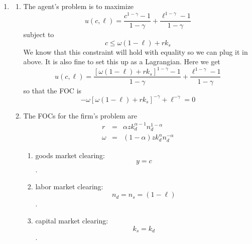 \documentclass[11pt]{article}
\begin{document}
\begin{enumerate}
\item 
\begin{enumerate}
\item The agent's problem is to maximize%
\begin{equation*}
u\left( c,\ell \right) =\frac{c^{1-\gamma }-1}{1-\gamma }+\frac{\ell
^{1-\gamma }-1}{1-\gamma }
\end{equation*}%
subject to 
\begin{equation*}
c\leq \omega \left( 1-\ell \right) +rk_{s}
\end{equation*}%
We know that this constraint will hold with equality so we can plug it in
above. It is also fine to set this up as a Lagrangian. Here we get 
\begin{equation*}
u\left( c,\ell \right) =\frac{\left[ \omega \left( 1-\ell \right) +rk_{s}%
\right] ^{1-\gamma }-1}{1-\gamma }+\frac{\ell ^{1-\gamma }-1}{1-\gamma }
\end{equation*}%
so that the FOC is 
\begin{equation}
-\omega \left[ \omega \left( 1-\ell \right) +rk_{s}\right] ^{-\gamma }+\ell
^{-\gamma }=0  \label{ut}
\end{equation}

\item The FOCs for the firm's problem are 
\begin{eqnarray}
r &=&\alpha zk_{d}^{\alpha -1}n_{d}^{1-\alpha }  \label{r} \\
\omega &=&\left( 1-\alpha \right) zk_{d}^{\alpha }n_{d}^{-\alpha }
\label{w2}
\end{eqnarray}

\begin{enumerate}
\item goods market clearing: 
\begin{equation}
y=c  \label{m1}
\end{equation}%
$.$

\item labor market clearing: 
\begin{equation}
n_{d}=n_{s}=\left( 1-\ell \right)  \label{m2}
\end{equation}%
$.$

\item capital market clearing:%
\begin{equation}
k_{s}=k_{d}  \label{m3}
\end{equation}%
$.$
\end{enumerate}


\end{enumerate}
\end{enumerate}
\end{document}
